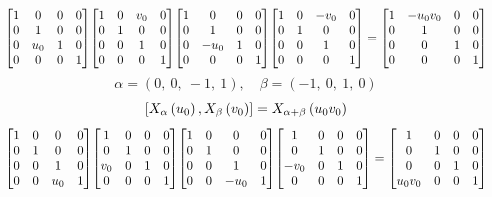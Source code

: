 \documentclass[11pt]{article}
\theoremstyle{definition}
\begin{document}
\[
\scaletoalign{\textwidth}{{\left[\begin{matrix}1 & 0 & 0 & 0\\0 & 1 & 0 & 0\\0 & u_{0} & 1 & 0\\0 & 0 & 0 & 1\end{matrix}\right]} {\left[\begin{matrix}1 & 0 & v_{0} & 0\\0 & 1 & 0 & 0\\0 & 0 & 1 & 0\\0 & 0 & 0 & 1\end{matrix}\right]} {\left[\begin{matrix}1 & 0 & 0 & 0\\0 & 1 & 0 & 0\\0 & - u_{0} & 1 & 0\\0 & 0 & 0 & 1\end{matrix}\right]} {\left[\begin{matrix}1 & 0 & - v_{0} & 0\\0 & 1 & 0 & 0\\0 & 0 & 1 & 0\\0 & 0 & 0 & 1\end{matrix}\right]} = {\left[\begin{matrix}1 & - u_{0} v_{0} & 0 & 0\\0 & 1 & 0 & 0\\0 & 0 & 1 & 0\\0 & 0 & 0 & 1\end{matrix}\right]}}
\]
\[
\alpha = \left( 0, \  0, \  -1, \  1\right), \quad \beta = \left( -1, \  0, \  1, \  0\right)
\]
\[
\scaletoalign{\textwidth}{\left[ X_{\alpha}\left(u_{0}\right), X_{\beta}\left(v_{0}\right) \right] = X_{\alpha + \beta}\left(u_{0} v_{0}\right)}
\]
\[
\scaletoalign{\textwidth}{{\left[\begin{matrix}1 & 0 & 0 & 0\\0 & 1 & 0 & 0\\0 & 0 & 1 & 0\\0 & 0 & u_{0} & 1\end{matrix}\right]} {\left[\begin{matrix}1 & 0 & 0 & 0\\0 & 1 & 0 & 0\\v_{0} & 0 & 1 & 0\\0 & 0 & 0 & 1\end{matrix}\right]} {\left[\begin{matrix}1 & 0 & 0 & 0\\0 & 1 & 0 & 0\\0 & 0 & 1 & 0\\0 & 0 & - u_{0} & 1\end{matrix}\right]} {\left[\begin{matrix}1 & 0 & 0 & 0\\0 & 1 & 0 & 0\\- v_{0} & 0 & 1 & 0\\0 & 0 & 0 & 1\end{matrix}\right]} = {\left[\begin{matrix}1 & 0 & 0 & 0\\0 & 1 & 0 & 0\\0 & 0 & 1 & 0\\u_{0} v_{0} & 0 & 0 & 1\end{matrix}\right]}}
\]
\end{document}
